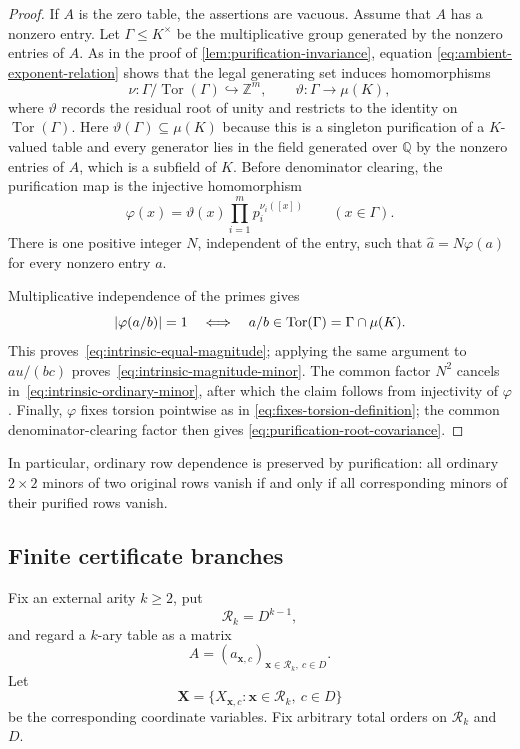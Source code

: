 \documentclass[11pt]{article}
\theoremstyle{plain}
\theoremstyle{definition}
\theoremstyle{remark}
\DeclareMathOperator{\Tor}{Tor}
\DeclarePairedDelimiter{\abs}{\lvert}{\rvert}
\begin{document}
\begin{proof}
If $A$ is the zero table, the assertions are vacuous.  Assume that $A$ has a
nonzero entry.
Let $\Gamma\le K^\times$ be the multiplicative group generated by the
nonzero entries of $A$.  As in the proof of
\cref{lem:purification-invariance}, equation
\eqref{eq:ambient-exponent-relation} shows that the legal generating set
induces homomorphisms
\[
  \nu:\Gamma/\Tor(\Gamma)\hookrightarrow\mathbb Z^m,
  \qquad
  \vartheta:\Gamma\longrightarrow\mu(K),
\]
where $\vartheta$ records the residual root of unity and restricts to the
identity on $\Tor(\Gamma)$.  Here $\vartheta(\Gamma)\subseteq\mu(K)$ because
this is a singleton purification of a $K$-valued table and every generator
lies in the field generated over $\mathbb Q$ by the nonzero entries of $A$,
which is a subfield of $K$.  Before denominator clearing, the purification
map is the injective homomorphism
\[
  \varphi(x)=\vartheta(x)
      \prod_{i=1}^m p_i^{\nu_i([x])}
  \qquad(x\in\Gamma).
\]
There is one positive integer $N$, independent of the entry, such that
$\widehat a=N\varphi(a)$ for every nonzero entry $a$.

Multiplicative independence of the primes gives
\[
  \abs{\varphi(a/b)}=1
  \quad\Longleftrightarrow\quad
  a/b\in\Tor(\Gamma)=\Gamma\cap\mu(K).
\]
This proves~\eqref{eq:intrinsic-equal-magnitude}; applying the same argument
to $au/(bc)$ proves~\eqref{eq:intrinsic-magnitude-minor}.  The common factor
$N^2$ cancels in~\eqref{eq:intrinsic-ordinary-minor}, after which the claim
follows from injectivity of $\varphi$.  Finally, $\varphi$ fixes torsion
pointwise as in \eqref{eq:fixes-torsion-definition}; the common
denominator-clearing factor then gives
\eqref{eq:purification-root-covariance}.
\end{proof}

In particular, ordinary row dependence is preserved by purification: all
ordinary $2\times2$ minors of two original rows vanish if and only if all
corresponding minors of their purified rows vanish.

\subsection{Finite certificate branches}

Fix an external arity $k\ge2$, put
\[
  \mathcal R_k=D^{k-1},
\]
and regard a $k$-ary table as a matrix
\[
  A=(a_{\mathbf x,c})_{\mathbf x\in\mathcal R_k,\ c\in D}.
\]
Let
\[
  \mathbf X=\{X_{\mathbf x,c}:
      \mathbf x\in\mathcal R_k,\ c\in D\}
\]
be the corresponding coordinate variables.  Fix arbitrary total orders on
$\mathcal R_k$ and $D$.
\end{document}
